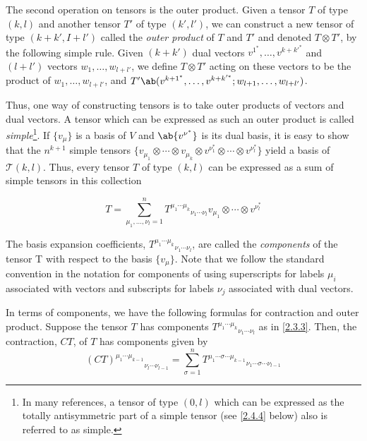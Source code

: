 The second operation on tensors is the outer product. Given a tensor $T$ of type $(k, l)$ and another tensor $T'$ of type $(k', l')$, we can construct a new tensor of type $(k+k', I+l')$ called the \emph{outer product} of $T$ and $T'$ and denoted $T\otimes T'$, by the following simple rule. Given $(k+k')$ dual vectors $v^{1^*},\ldots,v^{k+k'^*}$ and $(l+l')$ vectors $w_1,\ldots,w_{l+l'}$, we define $T\otimes T'$ acting on these vectors to be the product of $w_1,\ldots,w_{l+l'}$, and $T'\ab(v^{k+1^*},\ldots,v^{k+k'^*};w_{l+1},\ldots,w_{l+l'})$.

Thus, one way of constructing tensors is to take outer products of vectors and dual vectors. A tensor which can be expressed as such an outer product is called \emph{simple}\footnote{In many references, a tensor of type $(0,l)$ which can be expressed as the totally antisymmetric part of a simple tensor (see \eqref{2.4.4} below) also is referred to as simple.}. If $\{v_\mu\}$ is a basis of $V$ and $\ab\{v^{\nu^*}\}$ is its dual basis, it is easy to show that the $n^{k+1}$ simple tensors $\Big\{v_{\mu_1}\otimes\cdots\otimes v_{\mu_k}\otimes v^{\nu_1^*}\otimes\cdots\otimes v^{\nu_l^*}\Big\}$ yield a basis of $\mathscr{T}(k,l)$. Thus, every tensor $T$ of type $(k, l)$ can be expressed as a sum of simple tensors in this collection

\begin{equation}
    T=\sum_{\mu_1,\ldots,\nu_l=1}^n{T^{\mu_1\cdots\mu_k}}_{\nu_1\cdots\nu_l}v_{\mu_1}\otimes\cdots\otimes v^{\nu_l^*}
    \label{2.3.3}
\end{equation}

The basis expansion coefficients, ${T^{\mu_1\cdots\mu_k}}_{\nu_1\cdots\nu_l}$, are called the \emph{components} of the tensor T with respect to the basis $\{v_\mu\}$. Note that we follow the standard convention in the notation for components of using superscripts for labels $\mu_i$ associated with vectors and subscripts for labels $\nu_j$ associated with dual vectors.

In terms of components, we have the following formulas for contraction and outer product. Suppose the tensor $T$ has components ${T^{\mu_1\cdots\mu_k}}_{\nu_1\cdots\nu_l}$ as in \eqref{2.3.3}. Then, the contraction, $CT$, of $T$ has components given by
\begin{equation}
    {(CT)^{\mu_1\cdots\mu_{k-1}}}_{\nu_l\cdots\nu_{l-1}}=\sum_{\sigma=1}^n{T^{\mu_1\cdots\sigma\cdots\mu_{k-1}}}_{\nu_1\cdots\sigma\cdots\nu_{l-1}}
    \label{2.3.4}
\end{equation}

